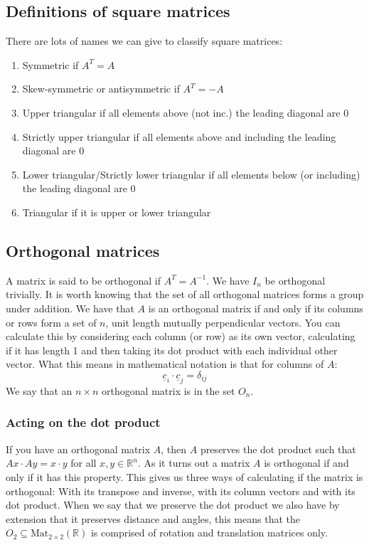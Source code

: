 \documentclass[12pt]{article}
\newcommand{\mat}[3]{\text{Mat}_{#1\times#2}(\mathbb{#3})}
\begin{document}
\subsection*{Definitions of square matrices}
There are lots of names we can give to classify square matrices:
\begin{enumerate}
    \item Symmetric if \(A^T=A\)
    \item Skew-symmetric or antisymmetric if \(A^T=-A\)
    \item Upper triangular if all elements above (not inc.) the leading diagonal are 0
    \item Strictly upper triangular if all elements above and including the leading diagonal are 0
    \item Lower triangular/Strictly lower triangular if all elements below (or including) the leading diagonal are 0
    \item Triangular if it is upper or lower triangular
\end{enumerate}
\subsection*{Orthogonal matrices}
A matrix is said to be orthogonal if \(A^T=A^{-1}\). We have \(I_n\) be orthogonal trivially. It is worth knowing that the set of all orthogonal matrices forms a group under addition. We have that \(A\) is an orthogonal matrix if and only if its columns or rows form a set of \(n\), unit length mutually perpendicular vectors. You can calculate this by considering each column (or row) as its own vector, calculating if it has length 1 and then taking its dot product with each individual other vector. What this means in mathematical notation is that for columns of \(A\):
\[\underline{c}_i\cdot\underline{c}_j=\delta_{ij}\]
We say that an \(n\times n\) orthogonal matrix is in the set \(O_n\). 
\subsubsection*{Acting on the dot product}
If you have an orthogonal matrix \(A\), then \(A\) preserves the dot product such that \(Ax\cdot Ay=x\cdot y\) for all \(x,y\in\mathbb{R}^n\). As it turns out a matrix \(A\) is orthogonal if and only if it has this property. This gives us three ways of calculating if the matrix is orthogonal: With its transpose and inverse, with its column vectors and with its dot product. When we say that we preserve the dot product we also have by extension that it preserves distance and angles, this means that the \(O_2\subseteq \mat{2}{2}{R}\) is comprised of rotation and translation matrices only.
\end{document}
